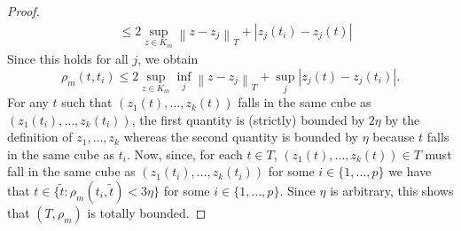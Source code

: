 \begin{proof}
{\begin{align*}
					  &\leq 2\sup_{z\in K_m}\left\|z-z_j\right\|_T + \left|z_j(t_i) - z_j(t)\right|
	\end{align*}
	Since this holds for all \(j\), we obtain
	 \[
		 \rho_m(t,t_i) \leq 2\sup_{z\in K_m}\inf_{j} \left\|z-z_j\right\|_T + \sup_j \left|z_j(t)-z_j(t_i)\right|
	.\] 
For any \(t\) such that  \(\left(z_1(t),\dots,z_k(t)\right)\) falls in the same cube as \(\left(z_1(t_i),\dots,z_k(t_i)\right)\), the first quantity is (strictly) bounded by \(2\eta\) by the definition of \(z_1,\dots,z_k\) whereas the second quantity is bounded by \(\eta\) because \(t\) falls in the same cube as \(t_i\). Now, since, for each \(t\in T\), \(\left(z_1(t),\dots,z_k(t)\right) \in T\) must fall in the same cube as \(\left(z_1(t_i),\dots,z_k(t_i)\right)\) for some \(i \in \{1,\dots,p\}\) we have that \(t \in \{\tilde t: \rho_m(t_i,\tilde t) < 3\eta\}\) for some \(i \in \{1,\dots,p\}\).  Since \(\eta\) is arbitrary, this shows that  \((T,\rho_m)\) is totally bounded.}


\end{proof}
